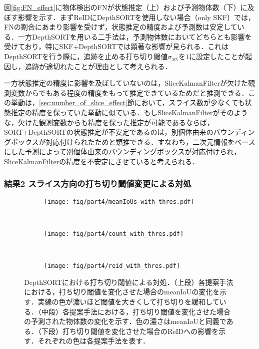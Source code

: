         図\ref{fig:FN_effect}に物体検出のFNが状態推定（上）および予測物体数（下）に及ぼす影響を示す．まずReIDにDepthSORTを使用しない場合（only SKF）では，FNの割合にあまり影響を受けず，状態推定の精度および予測数は安定している．一方DepthSORTを用いる二手法は，予測物体数においてどちらとも影響を受けており，特にSKF+DepthSORTでは顕著な影響が見られる．これはDepthSORTを行う際に，追跡を止める打ち切り閾値$\sigma_{\text{act}}$を$1$に設定したことが起因し，追跡が途切れたことが理由として考えられる．

        一方状態推定の精度に影響を及ぼしていないのは，SliceKalmanFilterが欠けた観測変数からでもある程度の精度をもって推定できているためだと推測できる．この挙動は，\ref{sec:number_of_slice_effect}節において，スライス数が少なくても状態推定の精度を保っていた挙動に似ている．もしSliceKalmanFilterがそのような，欠けた観測変数からも精度を保った推定が可能であるならば，SORT+DepthSORTの状態推定が不安定であるのは，別個体由来のバウンディングボックスが対応付けられたためと類推できる．すなわち，二次元情報をベースにした予測によって別個体由来のバウンディングボックスが対応付けられ，SliceKalmanFilterの精度を不安定にさせていると考えられる．

        \subsubsection{結果2 スライス方向の打ち切り閾値変更による対処}

        \begin{figure}[t]
            \begin{subfigure}[t]{\linewidth}
                \centering
                \texttt{[image: fig/part4/meanIoUs\_with\_thres.pdf]}
            \end{subfigure}
            \\
            \begin{subfigure}[t]{\linewidth}
                \centering
                \texttt{[image: fig/part4/count\_with\_thres.pdf]}
            \end{subfigure}
            \\
            \begin{subfigure}[t]{\linewidth}
                \centering
                \texttt{[image: fig/part4/reid\_with\_thres.pdf]}
            \end{subfigure}
            \caption[DepthSORTにおける打ち切り閾値による対処]{DepthSORTにおける打ち切り閾値による対処．（上段）各提案手法における，打ち切り閾値を変化させた場合のmeanIoUの変化を示す．実線の色が濃いほど閾値を大きくして打ち切りを緩和している．（中段）各提案手法における，打ち切り閾値を変化させた場合の予測された物体数の変化を示す．色の濃さはmeanIoUと同義である．（下段）打ち切り閾値を変化させた場合のReIDへの影響を示す．それぞれの色は各提案手法を表す．}
            \label{fig:handling_with_thres}
        \end{figure}

